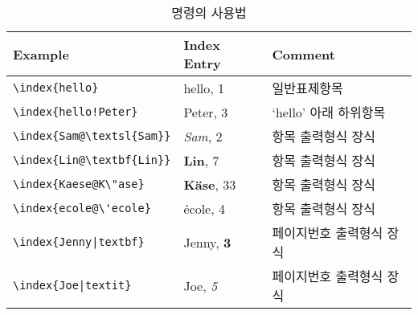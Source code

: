 \begin{table}[!tp]
\caption[index 명령의 사용법]{ 명령의 사용법}
\label{index}
\begin{center}
\begin{tabular}{@{}lll@{}}
  \textbf{Example} &\textbf{Index Entry} &\textbf{Comment}\\\hline
  \rule{0pt}{1.05em}\verb|\index{hello}| &hello, 1 & 일반표제항목 \\
\verb|\index{hello!Peter}|   &\hspace*{2ex}Peter, 3 & `hello' 아래 하위항목\\
\verb|\index{Sam@\textsl{Sam}}|     &\textsl{Sam}, 2& 항목 출력형식 장식\\
\verb|\index{Lin@\textbf{Lin}}|     &\textbf{Lin}, 7& 항목 출력형식 장식\\
\verb|\index{Kaese@K\"ase}|     &\textbf{K\"ase}, 33& 항목 출력형식 장식\\
\verb.\index{ecole@\'ecole}.     &\'ecole, 4& 항목 출력형식 장식\\
\verb.\index{Jenny|textbf}.     &Jenny, \textbf{3}& 페이지번호 출력형식 장식\\
\verb.\index{Joe|textit}.     &Joe, \textit{5}& 페이지번호 출력형식 장식
\end{tabular}
\end{center}
\end{table}

